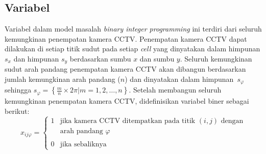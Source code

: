 \subsection{Variabel}
Variabel dalam model masalah \textit{binary integer programming} ini terdiri dari seluruh kemungkinan penempatan kamera CCTV. Penempatan kamera CCTV dapat dilakukan di setiap titik sudut pada setiap \textit{cell} yang dinyatakan dalam himpunan \(s_x\) dan himpunan \(s_y\) berdasarkan sumbu \(x\) dan sumbu \(y\). Seluruh kemungkinan sudut arah pandang penempatan kamera CCTV akan dibangun berdasarkan jumlah kemungkinan arah pandang (\(n\)) dan dinyatakan dalam himpunan~\(s_\varphi\) sehingga \(s_\varphi = \left\{\frac{m}{n} \times 2\pi \lvert m = 1,2,\dots,n \right\}\). Setelah membangun seluruh kemungkinan penempatan kamera CCTV, didefinisikan variabel biner sebagai berikut:
\begin{equation}
	x_{ij\varphi} =
	\left \{
		\begin{array}{ll}
			1 & \text{jika kamera CCTV ditempatkan pada titik }  (i,j)\text{ dengan}\\
			& \text{arah pandang } \varphi\\\\
			0 & \text{jika sebaliknya}
		\end{array}
	\right.
\end{equation}


